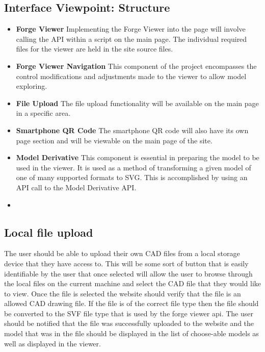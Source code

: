 \documentclass[letterpaper, 10pt, draftclsnofoot, compsoc, onecolumn]{IEEEtran}
\begin{document}
\subsection{Interface Viewpoint: Structure}
\begin{itemize}
	\item[]\textbf{Forge Viewer} Implementing the Forge Viewer into the page will involve calling the API within a script on the main page. The individual required files for the viewer are held in the site source files.
	
	\item[]\textbf{Forge Viewer Navigation} This component of the project encompasses the control modifications and adjustments made to the viewer to allow model exploring.
	 
	\item[]\textbf{File Upload} The file upload functionality will be available on the main page in a specific area.
	
	\item[]\textbf{Smartphone QR Code}  The smartphone QR code will also have its own page section and will be viewable on the main page of the site.
	
	\item[]\textbf{Model Derivative} This component is essential in preparing the model to be used in the viewer. It is used as a method of transforming a given model of one of many supported formats to SVG. This is accomplished by using an API call to the Model Derivative API.
	
	\item[]\textbf{} 
\end{itemize}

\subsection{Local file upload}
	The user should be able to upload their own CAD files from a local storage device that they have access to. This will be some sort of button that is easily identifiable by the user that once selected will allow the user to browse through the local files on the current machine and select the CAD file that they would like to view. Once the file is selected the website should verify that the file is an allowed CAD drawing file. If the file is of the correct file type then the file should be converted to the SVF file type that is used by the forge viewer api. The user should be notified that the file was successfully uploaded to the website and the model that was in the file should be displayed in the list of choose-able models as well as displayed in the viewer. 
\end{document}
